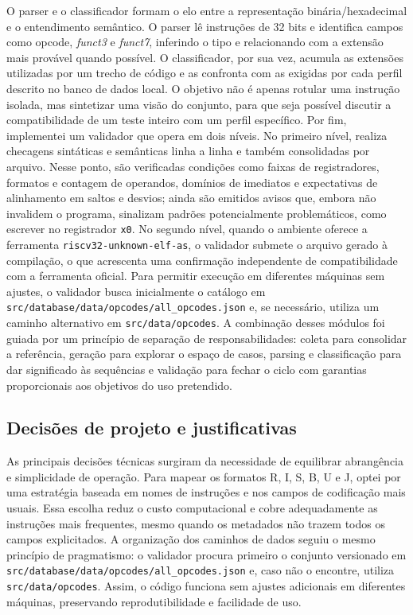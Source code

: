 \documentclass[12pt,a4paper]{article}
\begin{document}
\noindent O parser e o classificador formam o elo entre a representação binária/hexadecimal e o entendimento semântico. O parser lê instruções de 32 bits e identifica campos como opcode, \textit{funct3} e \textit{funct7}, inferindo o tipo e relacionando com a extensão mais provável quando possível. O classificador, por sua vez, acumula as extensões utilizadas por um trecho de código e as confronta com as exigidas por cada perfil descrito no banco de dados local. O objetivo não é apenas rotular uma instrução isolada, mas sintetizar uma visão do conjunto, para que seja possível discutir a compatibilidade de um teste inteiro com um perfil específico.
\newline
\noindent Por fim, implementei um validador que opera em dois níveis. No primeiro nível, realiza checagens sintáticas e semânticas linha a linha e também consolidadas por arquivo. Nesse ponto, são verificadas condições como faixas de registradores, formatos e contagem de operandos, domínios de imediatos e expectativas de alinhamento em saltos e desvios; ainda são emitidos avisos que, embora não invalidem o programa, sinalizam padrões potencialmente problemáticos, como escrever no registrador \texttt{x0}. No segundo nível, quando o ambiente oferece a ferramenta \texttt{riscv32-unknown-elf-as}, o validador submete o arquivo gerado à compilação, o que acrescenta uma confirmação independente de compatibilidade com a ferramenta oficial. Para permitir execução em diferentes máquinas sem ajustes, o validador busca inicialmente o catálogo em \texttt{src/database/data/opcodes/all_opcodes.json} e, se necessário, utiliza um caminho alternativo em \texttt{src/data/opcodes}.
\newline
\noindent A combinação desses módulos foi guiada por um princípio de separação de responsabilidades: coleta para consolidar a referência, geração para explorar o espaço de casos, parsing e classificação para dar significado às sequências e validação para fechar o ciclo com garantias proporcionais aos objetivos do uso pretendido.

\subsection*{Decisões de projeto e justificativas}
As principais decisões técnicas surgiram da necessidade de equilibrar abrangência e simplicidade de operação. Para mapear os formatos R, I, S, B, U e J, optei por uma estratégia baseada em nomes de instruções e nos campos de codificação mais usuais. Essa escolha reduz o custo computacional e cobre adequadamente as instruções mais frequentes, mesmo quando os metadados não trazem todos os campos explicitados. A organização dos caminhos de dados seguiu o mesmo princípio de pragmatismo: o validador procura primeiro o conjunto versionado em \texttt{src/database/data/opcodes/all_opcodes.json} e, caso não o encontre, utiliza \texttt{src/data/opcodes}. Assim, o código funciona sem ajustes adicionais em diferentes máquinas, preservando reprodutibilidade e facilidade de uso.
\end{document}
